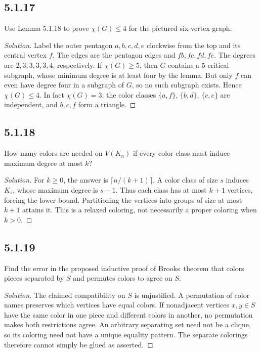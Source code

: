 \documentclass[12pt]{amsart}
\newenvironment{solution}{\begin{proof}[Solution]}{\end{proof}}
\begin{document}
    \subsection*{5.1.17} Use Lemma 5.1.18 to prove $\chi(G)\le4$ for the pictured six-vertex graph.
    \begin{solution}Label the outer pentagon $a,b,c,d,e$ clockwise from the top and its central vertex $f$. The edges are the pentagon edges and $fb,fc,fd,fe$. The degrees are $2,3,3,3,3,4$, respectively. If $\chi(G)\ge5$, then $G$ contains a $5$-critical subgraph, whose minimum degree is at least four by the lemma. But only $f$ can even have degree four in a subgraph of $G$, so no such subgraph exists. Hence $\chi(G)\le4$.
    In fact $\chi(G)=3$: the color classes $\{a,f\}$, $\{b,d\}$, $\{c,e\}$ are independent, and $b,c,f$ form a triangle.\end{solution}

    \subsection*{5.1.18} How many colors are needed on $V(K_n)$ if every color class must induce maximum degree at most $k$?
    \begin{solution}For $k\ge0$, the answer is $\lceil n/(k+1)\rceil$. A color class of size $s$ induces $K_s$, whose maximum degree is $s-1$. Thus each class has at most $k+1$ vertices, forcing the lower bound. Partitioning the vertices into groups of size at most $k+1$ attains it. This is a relaxed coloring, not necessarily a proper coloring when $k>0$.\end{solution}

    \subsection*{5.1.19} Find the error in the proposed inductive proof of Brooks\textquotesingle\ theorem that colors pieces separated by $S$ and permutes colors to agree on $S$.
    \begin{solution}The claimed compatibility on $S$ is unjustified. A permutation of color names preserves which vertices have equal colors. If nonadjacent vertices $x,y\in S$ have the same color in one piece and different colors in another, no permutation makes both restrictions agree. An arbitrary separating set need not be a clique, so its coloring need not have a unique equality pattern. The separate colorings therefore cannot simply be glued as asserted.\end{solution}
\end{document}
